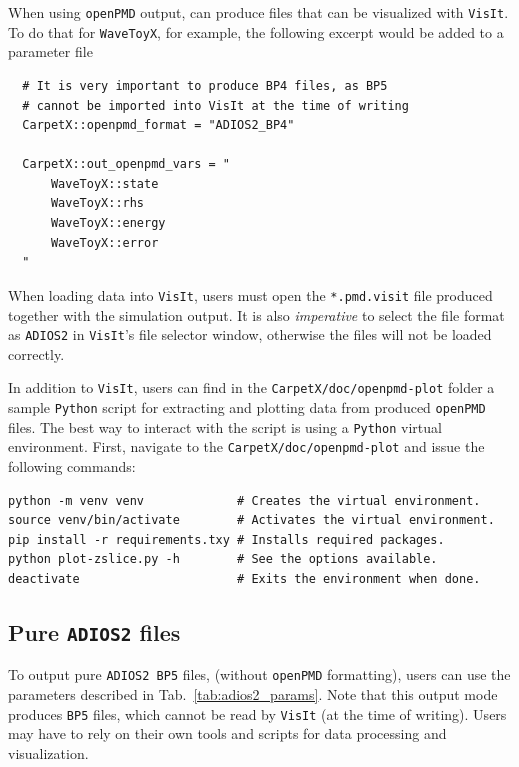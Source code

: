 When using \texttt{openPMD} output, \CarpetX\space can produce files that can be visualized with \texttt{VisIt}. To do that for \texttt{WaveToyX}, for example, the following excerpt would be added to a parameter file

\begin{verbatim}
  # It is very important to produce BP4 files, as BP5
  # cannot be imported into VisIt at the time of writing
  CarpetX::openpmd_format = "ADIOS2_BP4"
  
  CarpetX::out_openpmd_vars = "
      WaveToyX::state
      WaveToyX::rhs
      WaveToyX::energy
      WaveToyX::error
  "
\end{verbatim}

When loading data into \texttt{VisIt}, users must open the \texttt{*.pmd.visit} file produced together with the simulation output. It is also \textit{imperative} to select the file format as \texttt{ADIOS2} in \texttt{VisIt}'s file selector window, otherwise the files will not be loaded correctly.

In addition to \texttt{VisIt}, users can find in the \texttt{CarpetX/doc/openpmd-plot} folder a sample \texttt{Python} script for extracting and plotting data from \CarpetX\space produced \texttt{openPMD} files. The best way to interact with the script is using a \texttt{Python} virtual environment. First, navigate to the \texttt{CarpetX/doc/openpmd-plot} and issue the following commands:

\begin{verbatim}
python -m venv venv             # Creates the virtual environment.
source venv/bin/activate        # Activates the virtual environment.
pip install -r requirements.txy # Installs required packages.
python plot-zslice.py -h        # See the options available.
deactivate                      # Exits the environment when done.
\end{verbatim}

\subsection{Pure \texttt{ADIOS2} files}

To output pure \texttt{ADIOS2 BP5} files, (without \texttt{openPMD} formatting), users can use the parameters described in Tab.~\ref{tab:adios2_params}. Note that this output mode produces \texttt{BP5} files, which cannot be read by \texttt{VisIt} (at the time of writing). Users may have to rely on their own tools and scripts for data processing and visualization.

